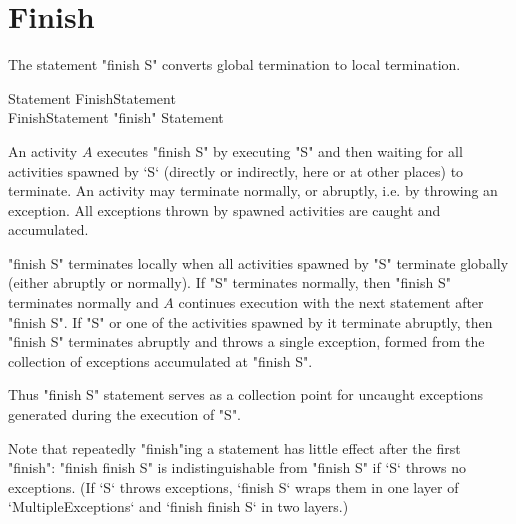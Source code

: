 \section{Finish}\label{finish}
The statement \xcd"finish S" converts global termination to local
termination.

\begin{grammar}
Statement \: FinishStatement \\
FinishStatement \: \xcd"finish" Statement 
\end{grammar}

An activity $A$ executes \xcd"finish S" by executing \xcd"S" and
then waiting for all activities spawned by \xcd`S` (directly or
indirectly, here or at other places) to terminate. An activity may
terminate normally, or abruptly, i.e. by throwing an exception.
All exceptions thrown by spawned activities are caught and
accumulated. 

\xcd"finish S" terminates locally when all activities spawned by
\xcd"S" terminate globally (either abruptly or normally). If \xcd"S"
terminates normally, then \xcd"finish S" terminates normally and $A$
continues execution with the next statement after \xcd"finish S".  If
\xcd"S" or one of the activities spawned by it terminate abruptly,
then \xcd"finish S" terminates abruptly and throws a single exception,
 formed from the collection of
exceptions accumulated at \xcd"finish S".

Thus \xcd"finish S" statement serves as a collection point for
uncaught exceptions generated during the execution of \xcd"S".

Note that repeatedly \xcd"finish"ing a statement has little effect after
the first \xcd"finish": \xcd"finish finish S" is indistinguishable
from \xcd"finish S" if \xcd`S` throws no exceptions.  (If \xcd`S` throws
exceptions, \xcd`finish S` wraps them in one layer of 
\xcd`MultipleExceptions` and \xcd`finish finish S` in two layers.)

